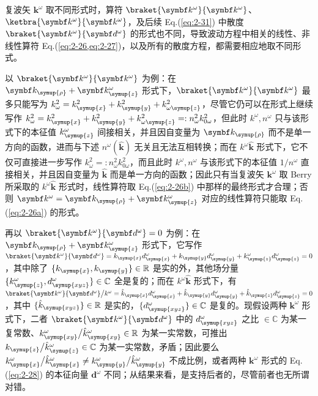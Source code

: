 复波矢 ${\symbf k}^\omega$ 取不同形式时，算符 $\braket{\symbf k^\omega}{\symbf k^\omega}$、 $\ketbra{\symbf k^\omega}{\symbf k^\omega}$，及后续 Eq.(\ref{eq:2-31}) 中散度 $\braket{\symbf k^\omega}{\symbf d^\omega}$ 的形式也不同，导致波动方程中相关的线性、非线性算符 Eq.(\cref{eq:2-26,eq:2-27})，以及所有的散度方程，都需要相应地取不同形式。

以 $\braket{\symbf k^\omega}{\symbf k^\omega}$ 为例：在 $\symbf k_{\symup{\rho}} + \symbf k^\omega_{\symup{z}}$ 形式下，$\braket{\symbf k^\omega}{\symbf k^\omega}$ 最多只能写为 $k^2_\omega = k_{\symup{x}}^2 + k_{\symup{y}}^2 + k_{\omega {\symup{z}}}^2$，尽管它仍可以在形式上继续写作 $k^2_\omega = k_{\symup{x}}^2 + k_{\symup{y}}^2 + k_{\omega {\symup{z}}}^2 =: n^2_\omega k^{2}_{0\omega}$，但此时 $k^\omega, n^\omega$ 只与该形式下的本征值 $k^\omega_{\symup{z}}$ 间接相关，并且因自变量为 $\symbf k_{\symup{\rho}}$ 而不是单一方向的函数，进而与下述 $n^\omega \left( \hat{\symbf k} \right)$ 无关且无法互相转换；而在 $k^\omega \hat{\symbf k}$ 形式下，它不仅可直接进一步写作 $\displaystyle{ k^2_\omega =: n^2_\omega k^{2}_{0\omega} }$，而且此时 $k^\omega, n^\omega$ 与该形式下的本征值 $1 \big/ n^\omega$ 直接相关，并且因自变量为 $\hat{\symbf k}$ 而是单一方向的函数；因此只有当复波矢 ${\symbf k}^\omega$ 取 Berry 所采取的 $k^\omega \hat{\symbf k}$ 形式时，线性算符取 Eq.(\ref{eq:2-26b}) 中那样的最终形式才合理；否则 $\symbf k^\omega = \symbf k_{\symup{\rho}} + \symbf k^\omega_{\symup{z}}$ 对应的线性算符只能取 Eq.(\ref{eq:2-26a}) 的形式。

再以 $\braket{\symbf k^\omega}{\symbf d^\omega} = 0$ 为例：在 $\symbf k_{\symup{\rho}} + \symbf k^\omega_{\symup{z}}$ 形式下，它写作 $\braket{\symbf k^\omega}{\symbf d^\omega} = k_{\symup{x}} d^{\omega}_{\symup{x}} + k_{\symup{y}} d^{\omega}_{\symup{y}} + k^{\omega}_{\symup{z}} d^{\omega}_{\symup{z}} = 0$，其中除了 $\{k_{\symup{x}}, k_{\symup{y}}\} \in \mathbb{R}$ 是实的外，其他场分量 $\{k^{\omega}_{\symup{z}}, d^{\omega}_{\symup{xyz}}\} \in \mathbb{C}$ 全是复的；而在 $k^\omega \hat{\symbf k}$ 形式下，有 $\braket{\symbf k^\omega}{\symbf d^\omega} \big/ k^\omega = \hat{k}_{\symup{x}} d^{\omega}_{\symup{x}} + \hat{k}_{\symup{y}} d^{\omega}_{\symup{y}} + \hat{k}_{\symup{z}} d^{\omega}_{\symup{z}} = 0$，其中 $\{\hat{k}_{\symup{xyz}}\} \in \mathbb{R}$ 是实的，$\{d^{\omega}_{\symup{xyz}}\} \in \mathbb{C}$ 是复的。现假设两种 ${\symbf k}^\omega$ 形式下，二者 $\braket{\symbf k^\omega}{\symbf d^\omega}$ 中的 $d^{\omega}_{\symup{xyz}}$ 之比 $\in \mathbb{C}$ 为某一复常数、$k^{\omega}_{\symup{xy}} \big/ \hat{k}^{\omega}_{\symup{xy}} \in \mathbb{R}$ 为某一实常数，可推出 $k_{\symup{z}} \big/ \hat{k}^{\omega}_{\symup{z}} \in \mathbb{C}$ 为某一实常数，矛盾；因此要么 $k^{\omega}_{\symup{x}} \big/ \hat{k}^{\omega}_{\symup{x}} \neq k^{\omega}_{\symup{y}} \big/ \hat{k}^{\omega}_{\symup{y}}$ 不成比例，或者两种 ${\symbf k}^\omega$ 形式的 Eq.(\ref{eq:2-28}) 的本征向量 $\symbf d^{\omega}$ 不同；从结果来看，是支持后者的\cite{mcleodVectorFourierOptics2014}，尽管前者也无所谓对错。

